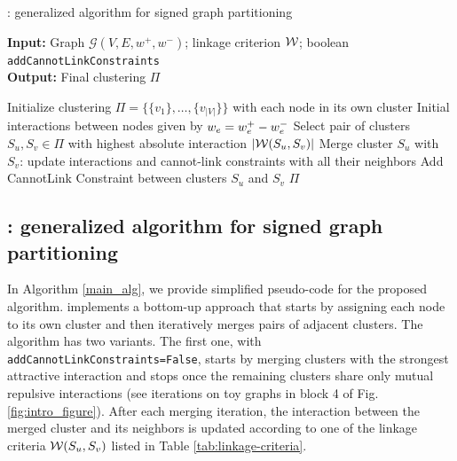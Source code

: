 \begin{algorithm}[t]
  \caption{\algname{}: generalized algorithm for signed graph partitioning}
   \hspace*{\algorithmicindent} \textbf{Input:} Graph $\mathcal{G}(V,E,w^+,w^-)$; linkage criterion $\mathcal{W}{}$; boolean {\color{blue}\texttt{addCannotLinkConstraints}}  \\
  \hspace*{\algorithmicindent} \textbf{Output:} Final clustering $\Pi$\\
  \hspace*{\algorithmicindent} 
  \begin{algorithmic}[1]
      \State Initialize clustering $\Pi=\{\{v_1\}, \ldots, \{v_{|V|}\}\}$ with each node in its own cluster
      \State Initial interactions between nodes given by $w_e = w^+_e - w^-_e$
      \Repeat
        \State Select pair of clusters $S_u,S_v\in\Pi$ with highest absolute interaction $|\mathcal{W}{}(S_u,S_v)|$
          \State Merge cluster $S_u$ with $S_v$: update interactions and cannot-link constraints with all their neighbors
          \State Add CannotLink Constraint between clusters $S_u$ and $S_v$
        \EndIf
      \State
      \Return $\Pi$
  \end{algorithmic}
  \label{main_alg}
\end{algorithm}

\subsection{\algname{}: generalized algorithm for signed graph partitioning} \label{sec:algorithm} 

In Algorithm \ref{main_alg}, we provide simplified pseudo-code for the proposed \algname{} algorithm. \algname{} implements a bottom-up approach that starts by assigning each node to its own cluster and then iteratively merges pairs of adjacent clusters. The algorithm has two variants. The first one, with \texttt{addCannotLinkConstraints=False}, starts by merging clusters with the strongest attractive interaction and stops once the remaining clusters share only mutual repulsive interactions (see iterations on toy graphs in block 4 of Fig. \hyperref[fig:intro_figure]{\ref*{fig:intro_figure}}). After each merging iteration, the interaction between the merged cluster and its neighbors is updated according to one of the linkage criteria $\mathcal{W}(S_u, S_v)$ listed in Table \ref{tab:linkage-criteria}.

